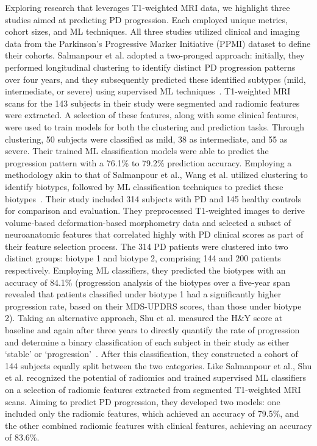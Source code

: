 Exploring research that leverages T1-weighted MRI data, we highlight three studies aimed at predicting PD progression. Each employed unique metrics, cohort sizes, and ML techniques. 
All three studies utilized clinical and imaging data from the Parkinson's Progressive Marker Initiative (PPMI) dataset to define their cohorts. Salmanpour et al. adopted a two-pronged 
approach: initially, they performed longitudinal clustering to identify distinct PD progression patterns over four years, and they subsequently predicted 
these identified subtypes (mild, intermediate, or severe) using supervised ML techniques~\cite{salmanpour_mojtaba_shamsaei_ghasem_hajianfar_hamid_soltanian_zadeh_arman_rahmim_2022}. 
T1-weighted MRI scans for the 143 subjects in their study were segmented and radiomic features were extracted. A selection of these features, along with some clinical features, were used to 
train models for both the clustering and prediction tasks. Through clustering, 50 subjects were classified as mild, 38 as intermediate, and 55 as severe. Their trained ML classification models 
were able to predict the progression pattern with a 76.1\% to 79.2\% prediction accuracy. Employing a methodology akin to that of Salmanpour et al., Wang et al. utilized clustering to identify 
biotypes, followed by ML classification techniques to predict these biotypes~\cite{wang_cheng_rolls_dai_gong_du_zhang_wang_liu_wang_et_al_2020}. Their study included 314 subjects with PD and 
145 healthy controls for comparison and evaluation. They preprocessed T1-weighted images to derive volume-based deformation-based morphometry data and selected a subset of neuroanatomic features 
that correlated highly with PD clinical scores as part of their feature selection process. The 314 PD patients were clustered into two distinct groups: biotype 1 and biotype 2, comprising 144 
and 200 patients respectively. Employing ML classifiers, they predicted the biotypes with an accuracy of 84.1\% (progression analysis of the biotypes over a five-year span revealed that 
patients classified under biotype 1 had a significantly higher progression rate, based on their MDS-UPDRS scores, than those under biotype 2). Taking an alternative approach, Shu et al. measured 
the H\&Y score at baseline and again after three years to directly quantify the rate of progression and determine a binary classification of each subject in their study as either `stable' or 
`progression'~\cite{shu2021predicting}. After this classification, they constructed a cohort of 144 subjects equally split between the two categories. Like Salmanpour et al., Shu et al. recognized 
the potential of radiomics and trained supervised ML classifiers on a selection of radiomic features extracted from segmented T1-weighted MRI scans. Aiming to predict PD progression, they developed two models: 
one included only the radiomic features, which achieved an accuracy of 79.5\%, and the other combined radiomic features with clinical features, achieving an accuracy of 83.6\%. 

